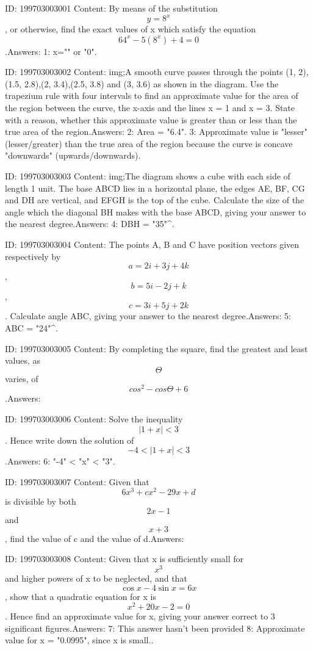 \documentclass{article}
\begin{document}
ID: 199703003001
Content:
By means of the substitution \[y = 8^{x}\], or otherwise, find the exact values of x which satisfy the equation \[64^{x} - 5(8^{x}) + 4 = 0\].Answers:
1: x="" or "0".

ID: 199703003002
Content:
img;A smooth curve passes through the points (1, 2),(1.5, 2.8),(2, 3.4),(2.5, 3.8) and (3, 3.6) as shown in the diagram. Use the trapezium rule with four intervals to find an approximate value for the area of the region between the curve, the x-axis and the lines x = 1 and x = 3. State with a reason, whether this approximate value is greater than or less than the true area of the region.Answers:
2: Area = "6.4".
3: Approximate value is "lesser" (lesser/greater) than the true area of the region because the curve is concave "downwards" (upwards/downwards).

ID: 199703003003
Content:
img;The diagram shows a cube with each side of length 1 unit. The base ABCD lies in a horizontal plane, the edges AE, BF, CG and DH are vertical, and EFGH is the top of the cube. Calculate the size of the angle which the diagonal BH makes with the base ABCD, giving your answer to the nearest degree.Answers:
4: \angle DBH = "35"^{\circ}.

ID: 199703003004
Content:
The points A, B and C have position vectors given respectively by \[a = 2i + 3j + 4k\], \[b = 5i - 2j + k\], \[c = 3i + 5j + 2k\]. Calculate angle ABC, giving your answer to the nearest degree.Answers:
5: \angle ABC = "24"^{\circ}.

ID: 199703003005
Content:
By completing the square, find the greatest and least values, as \[\Theta\] varies, of \[cos^{2} - cos\Theta + 6\].Answers:

ID: 199703003006
Content:
Solve the inequality \[|1 + x| < 3\]. Hence write down the solution of \[-4 < |1 + x| < 3\].Answers:
6: "-4" < "x" < "3".

ID: 199703003007
Content:
Given that \[6x^{3} + cx^{2} - 29x + d\] is divisible by both \[2x - 1\] and \[x + 3\], find the value of c and the value of d.Answers:

ID: 199703003008
Content:
Given that x is sufficiently small for \[x^{3}\] and higher powers of x to be neglected, and that \[\cos x - 4\sin x = 6x\], show that a quadratic equation for x is \[x^{2} + 20x - 2 = 0\]. Hence find an approximate value for x, giving your answer correct to 3 significant figures.Answers:
7: This answer hasn't been provided
8: Approximate value for x = "0.0995", since x is small..
\end{document}

